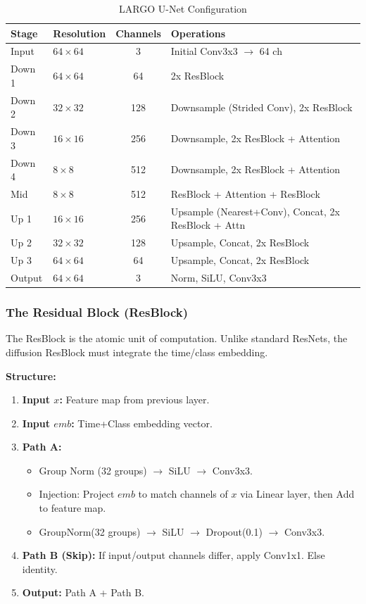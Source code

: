 \documentclass[12pt, a4paper]{article}
\begin{document}
\begin{table}[H]
    \centering
    \caption{LARGO U-Net Configuration}
    \begin{tabular}{@{}llcl@{}}
        \toprule
        \textbf{Stage} & \textbf{Resolution} & \textbf{Channels} & \textbf{Operations} \\
        \midrule
        Input & $64 \times 64$ & 3 & Initial Conv3x3 $\to$ 64 ch \\
        Down 1 & $64 \times 64$ & 64 & 2x ResBlock \\
        Down 2 & $32 \times 32$ & 128 & Downsample (Strided Conv), 2x ResBlock \\
        Down 3 & $16 \times 16$ & 256 & Downsample, 2x ResBlock + Attention \\
        Down 4 & $8 \times 8$ & 512 & Downsample, 2x ResBlock + Attention \\
        Mid & $8 \times 8$ & 512 & ResBlock + Attention + ResBlock \\
        Up 1 & $16 \times 16$ & 256 & Upsample (Nearest+Conv), Concat, 2x ResBlock + Attn \\
        Up 2 & $32 \times 32$ & 128 & Upsample, Concat, 2x ResBlock \\
        Up 3 & $64 \times 64$ & 64 & Upsample, Concat, 2x ResBlock \\
        Output & $64 \times 64$ & 3 & Norm, SiLU, Conv3x3 \\
        \bottomrule
    \end{tabular}
\end{table}

\subsubsection{The Residual Block (ResBlock)}
The ResBlock is the atomic unit of computation. Unlike standard ResNets, the diffusion ResBlock must integrate the time/class embedding.

\textbf{Structure:}
\begin{enumerate}
    \item \textbf{Input $x$:} Feature map from previous layer.
    \item \textbf{Input $emb$:} Time+Class embedding vector.
    \item \textbf{Path A:}
    \begin{itemize}
        \item Group Norm (32 groups) $\to$ SiLU $\to$ Conv3x3.
        \item Injection: Project $emb$ to match channels of $x$ via Linear layer, then Add to feature map.
        \item GroupNorm(32 groups) $\to$ SiLU $\to$ Dropout(0.1) $\to$ Conv3x3.
    \end{itemize}
    \item \textbf{Path B (Skip):} If input/output channels differ, apply Conv1x1. Else identity.
    \item \textbf{Output:} Path A + Path B.
\end{enumerate}
\end{document}
